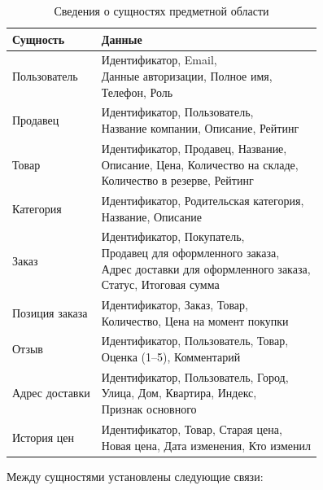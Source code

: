 \begin{table}[H]
    \caption{Сведения о сущностях предметной области}
    \label{tbl:entities}
    \begin{tabular}{|l|l|}
        \hline
        \textbf{Сущность} & \textbf{Данные} \\ \hline
        Пользователь & \makecell[l]{Идентификатор, Email,\\ Данные авторизации, Полное имя,\\ Телефон, Роль} \\ \hline
        Продавец & \makecell[l]{Идентификатор, Пользователь,\\ Название компании, Описание, Рейтинг} \\ \hline
        Товар & \makecell[l]{Идентификатор, Продавец, Название,\\ Описание, Цена, Количество на складе,\\ Количество в резерве, Рейтинг} \\ \hline
        Категория & \makecell[l]{Идентификатор, Родительская категория,\\ Название, Описание} \\ \hline
        Заказ & \makecell[l]{Идентификатор, Покупатель,\\ Продавец для оформленного заказа,\\ Адрес доставки для оформленного заказа,\\ Статус, Итоговая сумма} \\ \hline
        Позиция заказа & \makecell[l]{Идентификатор, Заказ, Товар,\\ Количество, Цена на момент покупки} \\ \hline
        Отзыв & \makecell[l]{Идентификатор, Пользователь, Товар,\\ Оценка (1--5), Комментарий} \\ \hline
        Адрес доставки & \makecell[l]{Идентификатор, Пользователь, Город,\\ Улица, Дом, Квартира, Индекс,\\ Признак основного} \\ \hline
        История цен & \makecell[l]{Идентификатор, Товар, Старая цена,\\ Новая цена, Дата изменения, Кто изменил} \\ \hline
    \end{tabular}
\end{table}

Между сущностями установлены следующие связи:

